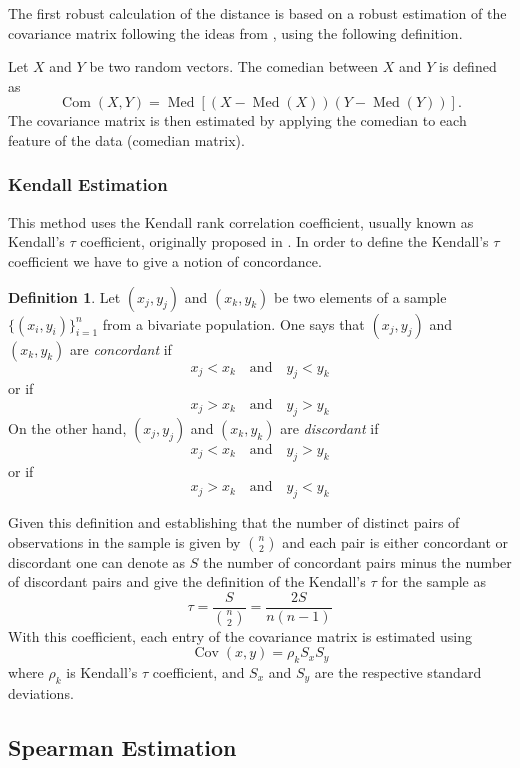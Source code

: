 \documentclass[11pt]{article}
\theoremstyle{definition}
\newtheorem{definition}{Definition}[section]
\theoremstyle{remark}
\theoremstyle{remark}
\theoremstyle{remark}
\begin{document}
The first robust calculation of the distance is based on a robust estimation of
the covariance matrix following the ideas from \parencite{falk1997mad}, using
the following definition.

Let $X$ and $Y$ be two random vectors. The comedian between $X$ and $Y$ is
defined as
%
\[
  \operatorname{Com}(X, Y)=\operatorname{Med}[(X-\operatorname{Med}(X))(Y-\operatorname{Med}(Y))].
\]
%
The covariance matrix is then estimated by applying the comedian to each feature
of the data (comedian matrix).

\subsubsection{Kendall Estimation}

This method uses the Kendall rank correlation coefficient, usually known as
Kendall's $\tau$ coefficient, originally proposed in \parencite{kendall1938new}.
In order to define the Kendall's $\tau$ coefficient we have to give a notion of
concordance.

\begin{definition}
  Let $(x_{j},y_{j})$ and $(x_{k},y_{k})$ be two elements of a sample
  $\{(x_{i},y_{i})\}_{i=1}^{n}$ from a bivariate population. One says that
  $(x_{j},y_{j})$ and $(x_{k},y_{k})$ are \textit{concordant} if
  \[
    x_{j} < x_{k} \quad \text{and} \quad y_{j} < y_{k}
  \]
  or if
  \[
    x_{j} > x_{k} \quad \text{and} \quad y_{j} > y_{k}
  \]
  On the other hand, $(x_{j},y_{j})$ and $(x_{k},y_{k})$ are \textit{discordant}
  if
  \[
    x_{j} < x_{k} \quad \text{and} \quad y_{j} > y_{k}
  \]
  or if
  \[
    x_{j} > x_{k} \quad \text{and} \quad y_{j} < y_{k}
  \]
\end{definition}

Given this definition and establishing that the number of distinct pairs of
observations in the sample is given by $\binom{n}{2}$ and each pair is either
concordant or discordant one can denote as $S$ the number of concordant pairs
minus the number of discordant pairs and give the definition of the Kendall's
$\tau$ for the sample as
%
\[
  \tau = \dfrac{S}{\binom{n}{2}} = \dfrac{2S}{n(n-1)}
\]
%
With this coefficient, each entry of the covariance matrix is estimated using
%
\[
  \operatorname{Cov}(x, y)=\rho_{k} S_{x} S_{y}
\]
%
where $\rho_{k}$ is Kendall's $\tau$ coefficient, and $S_{x}$ and $S_{y}$ are
the respective standard deviations.

\subsection{Spearman Estimation}
\end{document}
